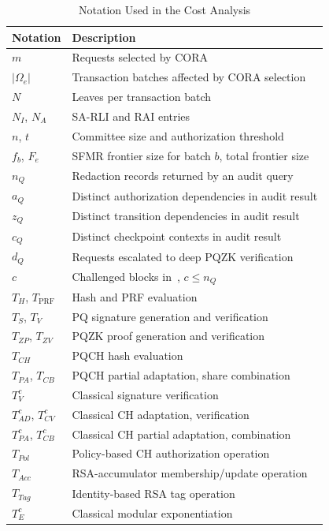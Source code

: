 \documentclass[lettersize,journal]{IEEEtran}
\begin{document}
\begin{table}[t]
\centering
\caption{Notation Used in the Cost Analysis}
\label{tab:cost-notation}
\scriptsize
\renewcommand{\arraystretch}{1.08}
\setlength{\tabcolsep}{3pt}
\begin{tabular}{ll}
\hline
\textbf{Notation} & \textbf{Description} \\
\hline
$m$ & Requests selected by CORA \\
$|\Omega_e|$ & Transaction batches affected by CORA selection \\
$N$ & Leaves per transaction batch \\
$N_I$, $N_A$ & SA-RLI and RAI entries \\
$n$, $t$ & Committee size and authorization threshold \\
$f_b$, $F_e$ & SFMR frontier size for batch $b$, total frontier size \\
$n_Q$ & Redaction records returned by an audit query \\
$a_Q$ & Distinct authorization dependencies in audit result \\
$z_Q$ & Distinct transition dependencies in audit result \\
$c_Q$ & Distinct checkpoint contexts in audit result \\
$d_Q$ & Requests escalated to deep PQZK verification \\
$c$ & Challenged blocks in~\cite{ref13}, $c\le n_Q$ \\
\hline
$T_H$, $T_{\mathrm{PRF}}$ & Hash and PRF evaluation \\
$T_S$, $T_V$ & PQ signature generation and verification \\
$T_{ZP}$, $T_{ZV}$ & PQZK proof generation and verification \\
$T_{CH}$ & PQCH hash evaluation \\
$T_{PA}$, $T_{CB}$ & PQCH partial adaptation, share combination \\
$T_V^{c}$ & Classical signature verification \\
$T_{AD}^{c}$, $T_{CV}^{c}$ & Classical CH adaptation, verification \\
$T_{PA}^{c}$, $T_{CB}^{c}$ & Classical CH partial adaptation, combination \\
$T_{Pol}$ & Policy-based CH authorization operation \\
$T_{Acc}$ & RSA-accumulator membership/update operation \\
$T_{Tag}$ & Identity-based RSA tag operation~\cite{ref13} \\
$T_E^{c}$ & Classical modular exponentiation \\
\hline
\end{tabular}
\end{table}
\end{document}
